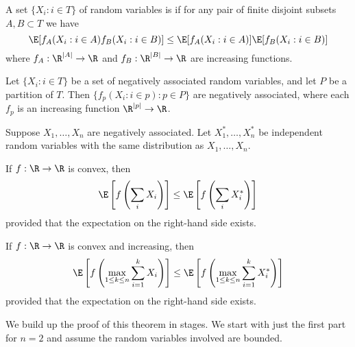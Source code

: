 \documentclass{article}
\begin{document}

\begin{definition}
  A set $\{X_i : i \in T\}$ of random variables is  if for any pair of finite disjoint subsets $A, B \subset T$
  we have
  \[\E[f_A(X_i: i \in A)f_B(X_i: i \in B)] \le \E[f_A(X_i: i \in A)]\E[f_B(X_i: i \in B)]\]
  where $f_A : \R^{|A|} \to \R$ and $f_B : \R^{|B|} \to \R$ are increasing functions.
\end{definition}

\begin{fact}
  Let $\{X_i : i \in T\}$ be a set of negatively associated random variables,
  and let $P$ be a partition of $T$.
  Then $\{f_p(X_i : i \in p) : p \in P\}$ are negatively associated,
  where each $f_p$ is an increasing function $\R^{|p|} \to \R$.
\end{fact}

\begin{theorem}
  \label{thm:na-convex}
  Suppose $X_1, \dots, X_n$ are negatively associated.
  Let $X_1^*, \dots, X_n^*$ be independent random variables with the same distribution as $X_1, \dots, X_n$.
  \begin{thmenum}
  \item \label{thm:na-convex-sum} If $f : \R \to \R$ is convex, then
    \[\E\left[f\left(\sum_i X_i\right)\right] \le \E\left[f\left(\sum_i X_i^*\right)\right]\]
    provided that the expectation on the right-hand side exists.

  \item \label{thm:na-convex-maxsum}
    If $f : \R \to \R$ is convex and increasing, then
    \[\E\left[f\left(\max_{1 \le k \le n} \sum_{i=1}^k X_i\right)\right] \le \E\left[f\left(\max_{1 \le k \le n} \sum_{i=1}^k X_i^*\right)\right]\]
    provided that the expectation on the right-hand side exists.
  \end{thmenum}
\end{theorem}

We build up the proof of this theorem in stages.  We start with just the first part for $n = 2$ and assume the random variables involved are bounded.
\end{document}
